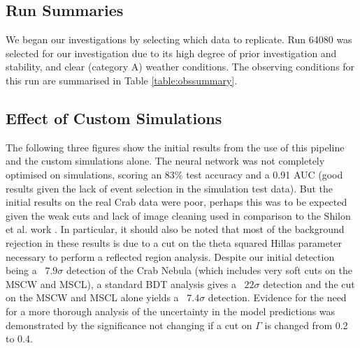\subsection{Run Summaries}
We began our investigations by selecting which data to replicate. Run 64080 was selected for our investigation due to its high degree of prior investigation and stability, and clear (category A) weather conditions. The observing conditions for this run are summarised in Table \ref{table:obssummary}.
\begin{table}[h]
    \centering
    \caption{Observing summary for run 64080}
    \label{table:obssummary}
\end{table}

\subsection{Effect of Custom Simulations}
The following three figures show the initial results from the use of this pipeline and the custom simulations alone. The neural network was not completely optimised on simulations, scoring an 83\% test accuracy and a 0.91 AUC (good results given the lack of event selection in the simulation test data). But the initial results on the real Crab data were poor, perhaps this was to be expected given the weak cuts and lack of image cleaning used in comparison to the Shilon et al. work \cite{Shilon}. In particular, it should also be noted that most of the background rejection in these results is due to a cut on the theta squared Hillas parameter necessary to perform a reflected region analysis. Despite our initial detection being a ~$7.9\sigma$ detection of the Crab Nebula (which includes very soft cuts on the MSCW and MSCL), a standard BDT analysis gives a ~$22\sigma$ detection and the cut on the MSCW and MSCL alone yields a ~$7.4\sigma$ detection. Evidence for the need for a more thorough analysis of the  uncertainty in the model predictions was demonstrated by the significance not changing if a cut on $\Gamma$ is changed from 0.2 to 0.4.


